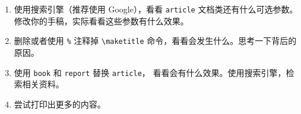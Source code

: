 \begin{enumerate}
  \item 使用搜索引擎（推荐使用 Google），看看 \lstinline[style = iltx]|article|
  文档类还有什么可选参数。修改你的手稿，实际看看这些参数有什么效果。
  \item 删除或者使用 \lstinline[style = iltx]|%| 注释掉
  \lstinline[style = iltx]|\maketitle| 命令，看看会发生什么。思考一下背后的原因。
  \item 使用 \lstinline[style = iltx]|book| 和
  \lstinline[style = iltx]|report| 替换 \lstinline[style = iltx]|article|，
  看看会有什么效果。使用搜索引擎，检索相关资料。
  \item 尝试打印出更多的内容。
\end{enumerate}

\endinput
